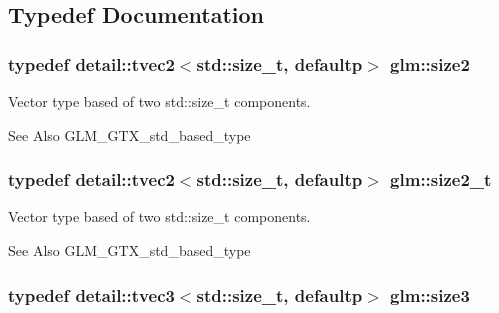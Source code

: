 \subsection{Typedef Documentation}
\hypertarget{group__gtx__std__based__type_ga393e8beba20ea33452384087a2864f86}{
\subsubsection[{size2}]{\setlength{\rightskip}{0pt plus 5cm}typedef detail\-::tvec2$<$std\-::size\-\_\-t, defaultp$>$ {\bf glm\-::size2}}}\label{group__gtx__std__based__type_ga393e8beba20ea33452384087a2864f86}
Vector type based of two std\-::size\-\_\-t components. \begin{DoxySeeAlso}{See Also}
G\-L\-M\-\_\-\-G\-T\-X\-\_\-std\-\_\-based\-\_\-type 
\end{DoxySeeAlso}
\hypertarget{group__gtx__std__based__type_ga64be170f9203528ff59efa40b1977bb0}{
\subsubsection[{size2\-\_\-t}]{\setlength{\rightskip}{0pt plus 5cm}typedef detail\-::tvec2$<$std\-::size\-\_\-t, defaultp$>$ {\bf glm\-::size2\-\_\-t}}}\label{group__gtx__std__based__type_ga64be170f9203528ff59efa40b1977bb0}
Vector type based of two std\-::size\-\_\-t components. \begin{DoxySeeAlso}{See Also}
G\-L\-M\-\_\-\-G\-T\-X\-\_\-std\-\_\-based\-\_\-type 
\end{DoxySeeAlso}
\hypertarget{group__gtx__std__based__type_gae1dda4cdccd4c1abeeb2e470c048d0c9}{
\subsubsection[{size3}]{\setlength{\rightskip}{0pt plus 5cm}typedef detail\-::tvec3$<$std\-::size\-\_\-t, defaultp$>$ {\bf glm\-::size3}}}\label{group__gtx__std__based__type_gae1dda4cdccd4c1abeeb2e470c048d0c9}
